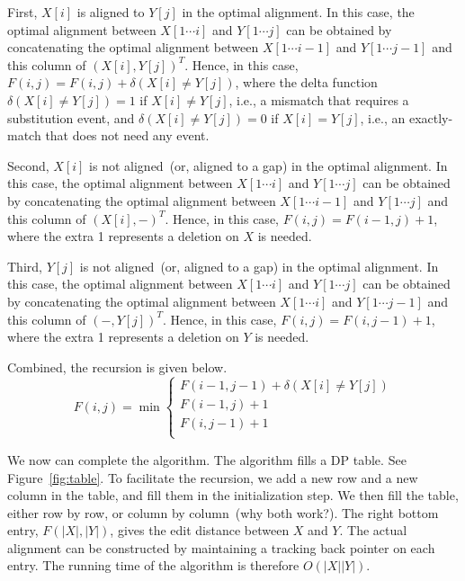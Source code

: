 \documentclass[letterpaper,11pt]{article}
\theoremstyle{mytheorem}
\begin{document}
First, $X[i]$ is aligned to $Y[j]$ in the optimal alignment. In this case, the optimal alignment
between $X[1\cdots i]$ and $Y[1\cdots j]$ can be obtained by concatenating the optimal alignment
between $X[1\cdots i-1]$ and $Y[1\cdots j-1]$ and this column of $(X[i], Y[j])^T$.
Hence, in this case, $F(i,j) = F(i, j) + \delta(X[i] \neq Y[j])$, where the delta function
$\delta(X[i] \neq Y[j]) = 1$ if $X[i] \neq Y[j]$, i.e., a mismatch that requires a substitution event,
and $\delta(X[i] \neq Y[j]) = 0$ if $X[i] = Y[j]$, i.e., an exactly-match that does not need any event.

Second, $X[i]$ is not aligned~(or, aligned to a gap) in the optimal alignment. In this case, the optimal alignment
between $X[1\cdots i]$ and $Y[1\cdots j]$ can be obtained by concatenating the optimal alignment
between $X[1\cdots i-1]$ and $Y[1\cdots j]$ and this column of $(X[i], -)^T$.
Hence, in this case, $F(i,j) = F(i-1, j) + 1$, where 
the extra 1 represents a deletion on $X$ is needed.

Third, $Y[j]$ is not aligned~(or, aligned to a gap) in the optimal alignment. In this case, the optimal alignment
between $X[1\cdots i]$ and $Y[1\cdots j]$ can be obtained by concatenating the optimal alignment
between $X[1\cdots i]$ and $Y[1\cdots j-1]$ and this column of $(-, Y[j])^T$.
Hence, in this case, $F(i,j) = F(i, j- 1) + 1$, where 
the extra 1 represents a deletion on $Y$ is needed.

Combined, the recursion is given below.
\begin{displaymath}
F(i,j) = \min\left\{
	\begin{array}{llll}
	F(i-1,j-1) + \delta(X[i] \neq Y[j]) \\
	F(i-1,j) + 1 \\
	F(i,j-1) + 1 \\
	\end{array}
\right.
\end{displaymath}

We now can complete the algorithm. The algorithm fills a DP table. See Figure~\ref{fig:table}.
To facilitate the recursion, we add a new row and a new column in the table,
and fill them in the initialization step. 
We then fill the table, either row by row, or column by column~(why both work?).
The right bottom entry, $F(|X|, |Y|)$, gives the edit distance between $X$ and $Y$.
The actual alignment can be constructed by maintaining a tracking back pointer on each entry.
The running time of the algorithm is therefore $O(|X||Y|)$.
\end{document}

